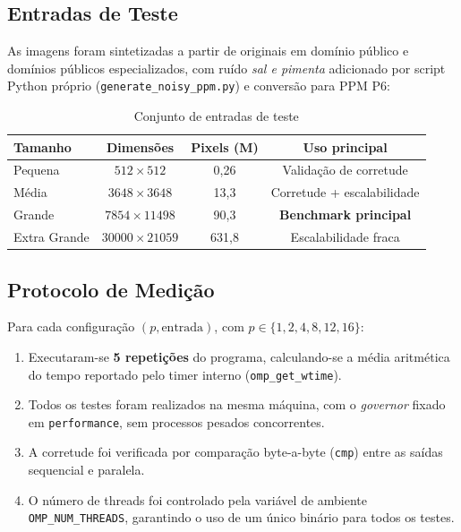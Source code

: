 \documentclass[12pt]{article}
\begin{document}
\subsection{Entradas de Teste}

As imagens foram sintetizadas a partir de originais em domínio público e domínios públicos especializados, com ruído \textit{sal e pimenta} adicionado por script Python próprio (\texttt{generate\_noisy\_ppm.py}) e conversão para PPM P6:

\begin{table}[ht]
	\centering
	\caption{Conjunto de entradas de teste}
	\label{tab:entradas}
	\begin{tabular}{lccc}
		\toprule
		\textbf{Tamanho} & \textbf{Dimensões}   & \textbf{Pixels (M)} & \textbf{Uso principal}       \\
		\midrule
		Pequena          & $512 \times 512$     & 0,26                & Validação de corretude       \\
		Média            & $3648 \times 3648$   & 13,3                & Corretude + escalabilidade   \\
		Grande           & $7854 \times 11498$  & 90,3                & \textbf{Benchmark principal} \\
		Extra Grande     & $30000 \times 21059$ & 631,8               & Escalabilidade fraca         \\
		\bottomrule
	\end{tabular}
\end{table}

\subsection{Protocolo de Medição}

Para cada configuração $(p, \text{entrada})$, com $p \in \{1, 2, 4, 8, 12, 16\}$:

\begin{enumerate}
	\item Executaram-se \textbf{5 repetições} do programa, calculando-se a média aritmética do tempo reportado pelo timer interno (\texttt{omp\_get\_wtime}).
	\item Todos os testes foram realizados na mesma máquina, com o \textit{governor} fixado em \texttt{performance}, sem processos pesados concorrentes.
	\item A corretude foi verificada por comparação byte-a-byte (\texttt{cmp}) entre as saídas sequencial e paralela.
	\item O número de threads foi controlado pela variável de ambiente \texttt{OMP\_NUM\_THREADS}, garantindo o uso de um único binário para todos os testes.
\end{enumerate}
\end{document}
